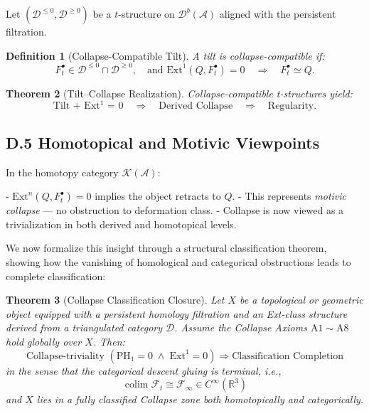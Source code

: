 \documentclass[11pt]{article}
\DeclareMathOperator{\colim}{colim}
\newtheorem{theorem}{Theorem}[section]
\newtheorem{definition}[theorem]{Definition}
\begin{document}
Let $(\mathcal{D}^{\leq 0}, \mathcal{D}^{\geq 0})$ be a $t$-structure on $\mathcal{D}^b(\mathcal{A})$ aligned with the persistent filtration.

\begin{definition}[Collapse-Compatible Tilt]
A tilt is collapse-compatible if:
\[
F^\bullet_t \in \mathcal{D}^{\leq 0} \cap \mathcal{D}^{\geq 0},\quad \text{and } \mathrm{Ext}^1(Q, F^\bullet_t) = 0 \quad \Rightarrow \quad F^\bullet_t \simeq Q.
\]
\end{definition}

\begin{theorem}[Tilt–Collapse Realization]
Collapse-compatible t-structures yield:
\[
\text{Tilt + Ext$^1$ = 0} \quad \Rightarrow \quad \text{Derived Collapse} \quad \Rightarrow \quad \text{Regularity}.
\]
\end{theorem}

\subsection*{D.5 Homotopical and Motivic Viewpoints}

In the homotopy category \( \mathcal{K}(\mathcal{A}) \):

- \( \mathrm{Ext}^n(Q, F^\bullet_t) = 0 \) implies the object retracts to \( Q \).
- This represents \emph{motivic collapse} — no obstruction to deformation class.
- Collapse is now viewed as a trivialization in both derived and homotopical levels.

\bigskip

We now formalize this insight through a structural classification theorem, showing how the vanishing of homological and categorical obstructions leads to complete classification:

\begin{theorem}[Collapse Classification Closure]
Let \( X \) be a topological or geometric object equipped with a persistent homology filtration and an Ext-class structure derived from a triangulated category \( \mathcal{D} \).  
Assume the Collapse Axioms \( \mathrm{A}1 \sim \mathrm{A}8 \) hold globally over \( X \).  
Then:
\[
\text{Collapse-triviality } \left(\mathrm{PH}_1 = 0 \;\wedge\; \mathrm{Ext}^1 = 0 \right) \Rightarrow \text{Classification Completion}
\]
in the sense that the categorical descent gluing is terminal, i.e.,
\[
\colim \mathcal{F}_t \cong \mathcal{F}_\infty \in C^\infty(\mathbb{R}^3)
\]
and \( X \) lies in a fully classified Collapse zone both homotopically and categorically.
\end{theorem}
\end{document}
